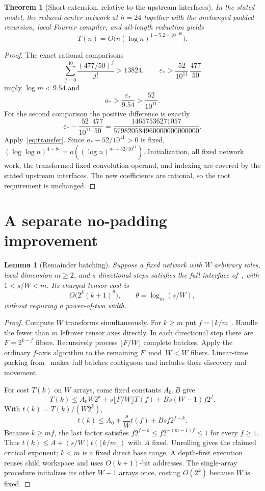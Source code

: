 \documentclass[11pt]{article}
\newtheorem{theorem}{Theorem}
\newtheorem{lemma}{Lemma}
\begin{document}
\begin{theorem}[Short extension, relative to the upstream interfaces]
In the stated model, the reduced-center network at $h=24$ together with the unchanged padded recursion, local Fourier compiler, and all-length reduction yields
\[
 T(n)=O\bigl(n(\log n)^{1-5.2\times10^{-10}}\bigr).
\]
\end{theorem}
\begin{proof}
The exact rational comparisons
\[
 \sum_{j=0}^{40}\frac{(477/50)^j}{j!}>13824,
 \qquad
 \varepsilon_*>\frac{52}{10^{11}}\,\frac{477}{50}
\]
imply $\log m<9.54$ and
\[
 a_*>\frac{\varepsilon_*}{9.54}>\frac{52}{10^{11}}.
\]
For the second comparison the positive difference is exactly
\[
 \varepsilon_*-\frac{52}{10^{11}}\frac{477}{50}
 =\frac{14657536271057}{579820584960000000000000}.
\]
Apply~\eqref{eq:transfer}. Since $a_*-52/10^{11}>0$ is fixed, $(\log\log n)^{4-\theta_*}=o((\log n)^{a_*-52/10^{11}})$. Initialization, all fixed network work, the transformed fixed convolution operand, and indexing are covered by the stated upstream interfaces. The new coefficients are rational, so the root requirement is unchanged.
\end{proof}

\section{A separate no-padding improvement}
\begin{lemma}[Remainder batching]
Suppose a fixed network with $W$ arbitrary roles, local dimension $m\ge2$, and $s$ directional steps satisfies the full interface of~\cite[Proposition~2.4]{O}, with $1<s/W<m$. Its charged tensor cost is
\[
 O\bigl(2^k(k+1)^\theta\bigr),\qquad \theta=\log_m(s/W),
\]
without requiring a power-of-two width.
\end{lemma}
\begin{proof}
Compute $W$ transforms simultaneously. For $k\ge m$ put $f=\lfloor k/m\rfloor$. Handle the fewer than $m$ leftover tensor axes directly. In each directional step there are $F=2^{k-f}$ fibers. Recursively process $\lfloor F/W\rfloor$ complete batches. Apply the ordinary $f$-axis algorithm to the remaining $F\bmod W<W$ fibers. Linear-time packing from~\cite[Lemma~2.5]{O} makes full batches contiguous and includes their discovery and movement.

For cost $T(k)$ on $W$ arrays, some fixed constants $A_0,B$ give
\[
 T(k)\le A_0W2^k+s\lfloor F/W\rfloor T(f)
                 +Bs(W-1)f2^f.
\]
With $t(k)=T(k)/(W2^k)$,
\[
 t(k)\le A_0+\frac{s}{W}t(f)+Bs f2^{f-k}.
\]
Because $k\ge mf$, the last factor satisfies $f2^{f-k}\le f2^{-(m-1)f}\le1$ for every $f\ge1$. Thus $t(k)\le A+(s/W)t(\lfloor k/m\rfloor)$ with $A$ fixed. Unrolling gives the claimed critical exponent; $k<m$ is a fixed direct base range. A depth-first execution reuses child workspace and uses $O(k+1)$-bit addresses. The single-array procedure initializes its other $W-1$ arrays once, costing $O(2^k)$ because $W$ is fixed.
\end{proof}
\end{document}
